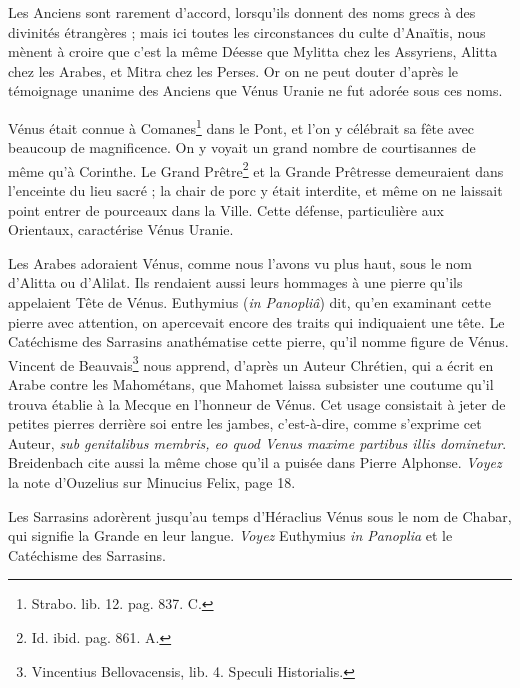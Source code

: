 \documentclass[a4paper, 11pt, oneside, polutonikogreek, french]{article}
\begin{document}
Les Anciens sont rarement d'accord, lorsqu'ils donnent des noms grecs à des divinités étrangères ; mais ici toutes les circonstances du culte d'Anaïtis, nous mènent à croire que c'est la même Déesse que Mylitta chez les Assyriens, Alitta chez les Arabes, et Mitra chez les Perses. Or on ne peut douter d'après le témoignage unanime des Anciens que Vénus Uranie ne fut adorée sous ces noms.

Vénus était connue à Comanes\footnote{Strabo. lib. 12. pag. 837. C.} dans le Pont, et l'on y célébrait sa fête avec beaucoup de magnificence. On y voyait un grand nombre de courtisannes de même qu'à Corinthe. Le Grand Prêtre\footnote{Id. ibid. pag. 861. A.} et la Grande Prêtresse demeuraient dans l'enceinte du lieu sacré ; la chair de porc y était interdite, et même on ne laissait point entrer de pourceaux dans la Ville. Cette défense, particulière aux Orientaux, caractérise Vénus Uranie.

Les Arabes adoraient Vénus, comme nous l'avons vu plus haut, sous le nom d'Alitta ou d'Alilat. Ils rendaient aussi leurs hommages à une pierre qu'ils appelaient Tête de Vénus. Euthymius (\emph{in Panopliâ}) dit, qu'en examinant cette pierre avec attention, on apercevait encore des traits qui indiquaient une tête. Le Catéchisme des Sarrasins anathématise cette pierre, qu'il nomme figure de Vénus. Vincent de Beauvais\footnote{Vincentius Bellovacensis, lib. 4. Speculi Historialis.} nous apprend, d'après un Auteur Chrétien, qui a écrit en Arabe contre les Mahométans, que Mahomet laissa subsister une coutume qu'il trouva établie à la Mecque en l'honneur de Vénus. Cet usage consistait à jeter de petites pierres derrière soi entre les jambes, c'est-à-dire, comme s'exprime cet Auteur, \emph{sub genitalibus membris, eo quod Venus maxime partibus illis dominetur}. Breidenbach cite aussi la même chose qu'il a puisée dans Pierre Alphonse. \emph{Voyez} la note d'Ouzelius sur Minucius Felix, page 18.

Les Sarrasins adorèrent jusqu'au temps d'Héraclius Vénus sous le nom de Chabar, qui signifie la Grande en leur langue. \emph{Voyez} Euthymius \emph{in Panoplia} et le Catéchisme des Sarrasins.
\end{document}
